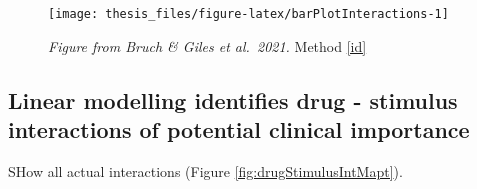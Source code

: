 \documentclass[11pt, a4paper, twosided]{book}
\begin{document}
\begin{figure}

{\centering \texttt{[image: thesis\_files/figure-latex/barPlotInteractions-1]} 

}

\caption{\emph{Figure from Bruch \& Giles et al.~2021.} Method \ref{id}}\label{fig:barPlotInteractions}
\end{figure}
\hypertarget{ID}{%
\subsection{Linear modelling identifies drug - stimulus interactions of potential clinical importance}\label{ID}}

SHow all actual interactions
(Figure \ref{fig:drugStimulusIntMapt}).
\end{document}
